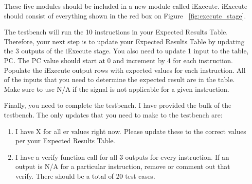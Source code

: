 These five modules should be included in a new module called iExecute.  iExecute should consist of everything shown in the red box on Figure ~\ref{fig:execute_stage}. 

The testbench will run the 10 instructions in your Expected Results Table.  Therefore, your next step is to update your Expected Results Table by updating the 3 outputs of the iExecute stage. You also need to update 1 input to the table, PC.  The PC value should start at 0 and increment by 4 for each instruction.  Populate the iExecute output rows with expected values for each instruction.  All of the inputs that you need to determine the expected result are in the table.  Make sure to use N/A if the signal is not applicable for a given instruction.

Finally, you need to complete the testbench.  I have provided the bulk of the testbench.  The only updates that you need to make to the testbench are:
\begin{enumerate}
	\item I have X for all er values right now.  Please update these to the correct values per your Expected Results Table.
	\item I have a verify function call for all 3 outputs for every instruction.  If an output is N/A for a particular instruction, remove or comment out that verify.  There should be a total of 20 test cases.  
\end{enumerate}   


